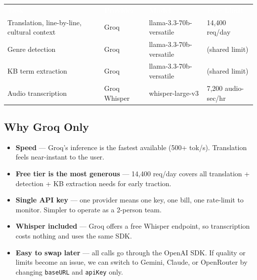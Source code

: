 \documentclass[12pt, a4paper]{article}
\begin{document}
\begin{tcolorbox}[prdbox, title={Groq --- Single Provider for All AI Tasks}]
\renewcommand{\arraystretch}{1.5}
\begin{center}
\begin{tabular}{L{3.5cm} L{3cm} L{3cm} L{3.5cm}}
  \textcolor{white}{\textbf{Task}} &
  \textcolor{white}{\textbf{Provider}} &
  \textcolor{white}{\textbf{Model}} &
  \textcolor{white}{\textbf{Free Limit}} \\
  Translation, line-by-line, cultural context &
  Groq & llama-3.3-70b-versatile &
  14,400 req/day \\
  Genre detection &
  Groq & llama-3.3-70b-versatile &
  (shared limit) \\
  KB term extraction &
  Groq & llama-3.3-70b-versatile &
  (shared limit) \\
  Audio transcription &
  Groq Whisper & whisper-large-v3 &
  7,200 audio-sec/hr \\
\end{tabular}
\end{center}
\end{tcolorbox}

\subsection{Why Groq Only}

\begin{itemize}
  \item \textbf{Speed} --- Groq's inference is the fastest available (500+ tok/s).
        Translation feels near-instant to the user.
  \item \textbf{Free tier is the most generous} --- 14,400 req/day covers all
        translation + detection + KB extraction needs for early traction.
  \item \textbf{Single API key} --- one provider means one key, one bill, one
        rate-limit to monitor. Simpler to operate as a 2-person team.
  \item \textbf{Whisper included} --- Groq offers a free Whisper endpoint,
        so transcription costs nothing and uses the same SDK.
  \item \textbf{Easy to swap later} --- all calls go through the OpenAI SDK.
        If quality or limits become an issue, we can switch to Gemini, Claude,
        or OpenRouter by changing \texttt{baseURL} and \texttt{apiKey} only.
\end{itemize}
\end{document}
